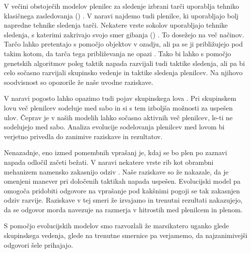 \begin{razsirjeniPovzetek}
V večini obstoječih modelov \cite{demsar2014simulated,demsar2015simulating,demsar2016balanced,demsar2017evolution,nishimura2002predator,zheng2005behavior} plenilec za sledenje izbrani tarči uporablja tehniko klasičnega zasledovanja () \cite{nahin2012chases}. V naravi najdemo tudi plenilce, ki uporabljajo bolj napredne tehnike sledenja tarči. Nekatere vrste sokolov uporabljajo tehnike sledenja, s katerimi zakrivajo svojo smer gibanja () \cite{kane2014falcons}. To dosežejo na več načinov. Tarčo lahko pretentajo s pomočjo objektov v ozadju, ali pa se ji približujejo pod takim kotom, da tarča tega približevanja ne opazi \cite{justh2006steering}. Tako bi lahko s pomočjo genetskih algoritmov poleg taktik napada razvijali tudi taktike sledenja, ali pa bi celo sočasno razvijali skupinsko vedenje in taktike sledenja plenilcev. Na njihovo soodvisnost so opozorile že naše uvodne raziskave.

V naravi pogosto lahko opazimo tudi pojav skupinskega lova \cite{creel1995communal,escobedo2014groupsize,fanshawe1993factors,lett2004continuous,muro2011wolfpack,packer1988evolution,scheel1991group}. Pri skupinskem lovu več plenilcev sodeluje med sabo in si s tem izboljša možnosti za uspešen ulov. Čeprav je v naših modelih lahko sočasno aktivnih več plenilcev, le-ti ne sodelujejo med sabo. Analiza evolucije sodelovanja plenilcev med lovom bi verjetno privedla do zanimive raziskave in rezultatov.

Nenazadnje, eno izmed pomembnih vprašanj je, kdaj se bo plen po zaznavi napada odločil začeti bežati. V naravi nekatere vrste rib kot obrambni mehanizem namensko zakasnijo odziv \cite{partridge1982structure}. Naše raziskave so že nakazale, da je omenjeni manever pri določenih taktikah napada uspešen. Evolucijski model pa omogoča pridobiti odgovore na vprašanje pod kakšnimi pogoji se tak zakasnjen odziv razvije. Raziskave v tej smeri že izvajamo in trenutni rezultati nakazujejo, da se odgovor morda navezuje na razmerja v hitrostih med plenilcem in plenom.

S pomočjo evolucijskih modelov smo razvozlali že marsikatero uganko glede skupinskega vedenja, glede na trenutne smernice pa verjamemo, da najzanimivejši odgovori šele prihajajo.

\end{razsirjeniPovzetek}